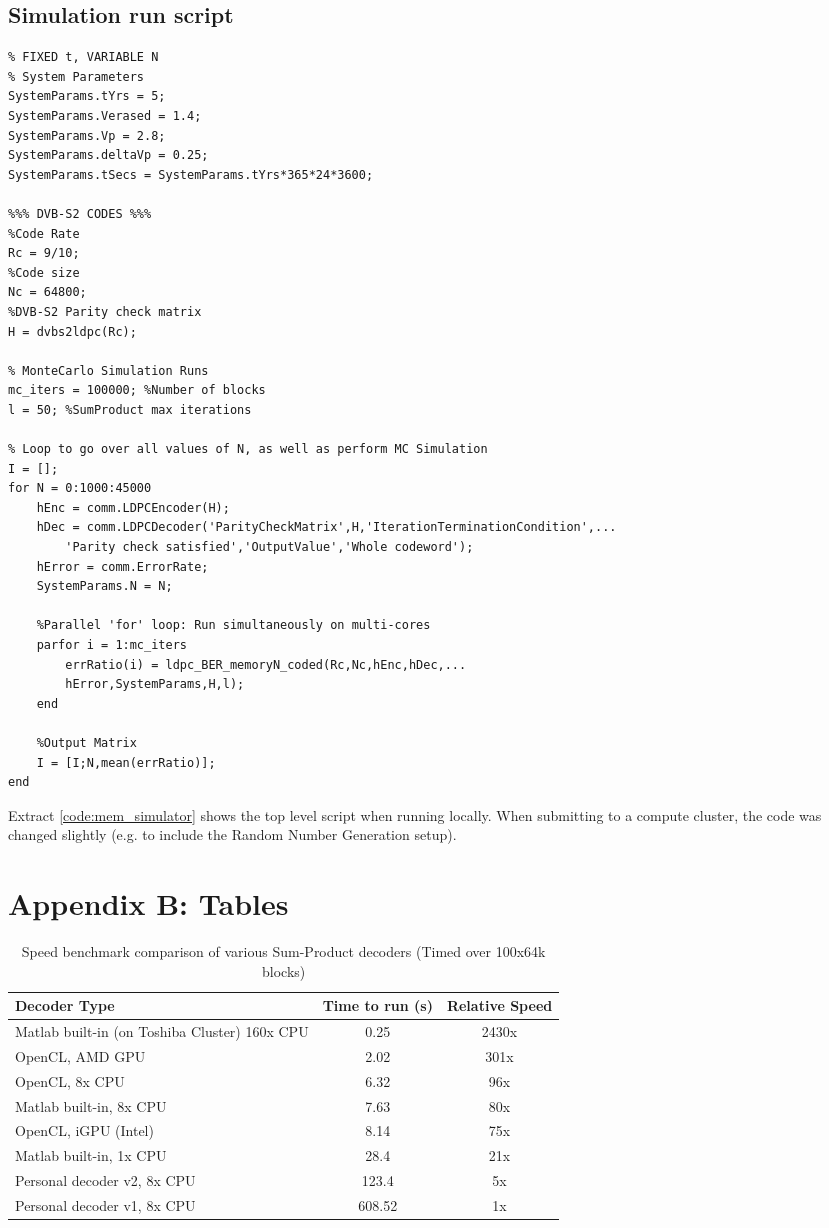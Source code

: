 \documentclass[11pt]{article}
\numberwithin{equation}{subsection}
\begin{document}
\subsection*{Simulation run script}
\begin{lstlisting}[style=Matlab-editor,caption = {Top-level Monte-Carlo simulation run script for the Memory channel},label=code:mem_simulator]
% LDPC Run Script for memory model
% FIXED t, VARIABLE N
% System Parameters
SystemParams.tYrs = 5;
SystemParams.Verased = 1.4;
SystemParams.Vp = 2.8;
SystemParams.deltaVp = 0.25;
SystemParams.tSecs = SystemParams.tYrs*365*24*3600;

%%% DVB-S2 CODES %%%
%Code Rate
Rc = 9/10;
%Code size
Nc = 64800;
%DVB-S2 Parity check matrix
H = dvbs2ldpc(Rc);

% MonteCarlo Simulation Runs
mc_iters = 100000; %Number of blocks
l = 50; %SumProduct max iterations

% Loop to go over all values of N, as well as perform MC Simulation
I = [];
for N = 0:1000:45000
    hEnc = comm.LDPCEncoder(H);
    hDec = comm.LDPCDecoder('ParityCheckMatrix',H,'IterationTerminationCondition',...
        'Parity check satisfied','OutputValue','Whole codeword');
    hError = comm.ErrorRate;
    SystemParams.N = N;

    %Parallel 'for' loop: Run simultaneously on multi-cores
    parfor i = 1:mc_iters
        errRatio(i) = ldpc_BER_memoryN_coded(Rc,Nc,hEnc,hDec,...
        hError,SystemParams,H,l);
    end

    %Output Matrix
    I = [I;N,mean(errRatio)];
end
\end{lstlisting}
\doublespacing
Extract \ref{code:mem_simulator} shows the top level script when running locally. When submitting to a compute cluster, the code was changed slightly (e.g. to include the Random Number Generation setup).

{}
\section*{Appendix B: Tables}

\begin{table}[ht]
\caption{Speed benchmark comparison of various Sum-Product decoders (Timed over 100x64k blocks)}
\centering
\singlespacing
\begin{tabular}{| l | c | c |}
\hline
Decoder Type & Time to run (s) & Relative Speed \\
\hline
Matlab built-in (on Toshiba Cluster) 160x CPU & 0.25 & 2430x \\
OpenCL, AMD GPU & 2.02 & 301x \\
OpenCL, 8x CPU & 6.32 & 96x \\
Matlab built-in, 8x CPU & 7.63 & 80x \\
OpenCL, iGPU (Intel) & 8.14 & 75x \\
Matlab built-in, 1x CPU & 28.4 & 21x \\
Personal decoder v2, 8x CPU & 123.4 & 5x \\
Personal decoder v1, 8x CPU & 608.52 & 1x \\
\hline
\end{tabular}
\end{table}
\end{document}

